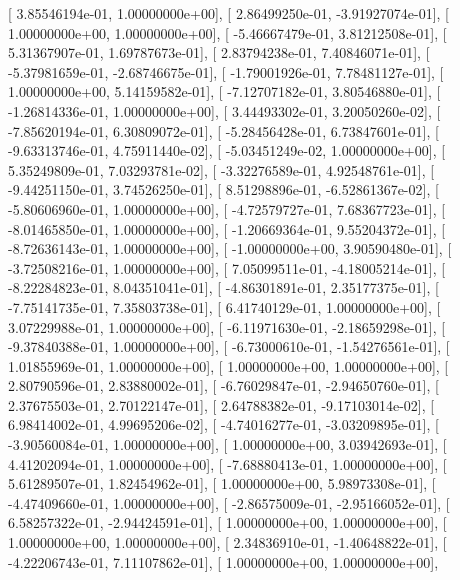 \documentclass{article}
\begin{document}
       [  3.85546194e-01,   1.00000000e+00],
       [  2.86499250e-01,  -3.91927074e-01],
       [  1.00000000e+00,   1.00000000e+00],
       [ -5.46667479e-01,   3.81212508e-01],
       [  5.31367907e-01,   1.69787673e-01],
       [  2.83794238e-01,   7.40846071e-01],
       [ -5.37981659e-01,  -2.68746675e-01],
       [ -1.79001926e-01,   7.78481127e-01],
       [  1.00000000e+00,   5.14159582e-01],
       [ -7.12707182e-01,   3.80546880e-01],
       [ -1.26814336e-01,   1.00000000e+00],
       [  3.44493302e-01,   3.20050260e-02],
       [ -7.85620194e-01,   6.30809072e-01],
       [ -5.28456428e-01,   6.73847601e-01],
       [ -9.63313746e-01,   4.75911440e-02],
       [ -5.03451249e-02,   1.00000000e+00],
       [  5.35249809e-01,   7.03293781e-02],
       [ -3.32276589e-01,   4.92548761e-01],
       [ -9.44251150e-01,   3.74526250e-01],
       [  8.51298896e-01,  -6.52861367e-02],
       [ -5.80606960e-01,   1.00000000e+00],
       [ -4.72579727e-01,   7.68367723e-01],
       [ -8.01465850e-01,   1.00000000e+00],
       [ -1.20669364e-01,   9.55204372e-01],
       [ -8.72636143e-01,   1.00000000e+00],
       [ -1.00000000e+00,   3.90590480e-01],
       [ -3.72508216e-01,   1.00000000e+00],
       [  7.05099511e-01,  -4.18005214e-01],
       [ -8.22284823e-01,   8.04351041e-01],
       [ -4.86301891e-01,   2.35177375e-01],
       [ -7.75141735e-01,   7.35803738e-01],
       [  6.41740129e-01,   1.00000000e+00],
       [  3.07229988e-01,   1.00000000e+00],
       [ -6.11971630e-01,  -2.18659298e-01],
       [ -9.37840388e-01,   1.00000000e+00],
       [ -6.73000610e-01,  -1.54276561e-01],
       [  1.01855969e-01,   1.00000000e+00],
       [  1.00000000e+00,   1.00000000e+00],
       [  2.80790596e-01,   2.83880002e-01],
       [ -6.76029847e-01,  -2.94650760e-01],
       [  2.37675503e-01,   2.70122147e-01],
       [  2.64788382e-01,  -9.17103014e-02],
       [  6.98414002e-01,   4.99695206e-02],
       [ -4.74016277e-01,  -3.03209895e-01],
       [ -3.90560084e-01,   1.00000000e+00],
       [  1.00000000e+00,   3.03942693e-01],
       [  4.41202094e-01,   1.00000000e+00],
       [ -7.68880413e-01,   1.00000000e+00],
       [  5.61289507e-01,   1.82454962e-01],
       [  1.00000000e+00,   5.98973308e-01],
       [ -4.47409660e-01,   1.00000000e+00],
       [ -2.86575009e-01,  -2.95166052e-01],
       [  6.58257322e-01,  -2.94424591e-01],
       [  1.00000000e+00,   1.00000000e+00],
       [  1.00000000e+00,   1.00000000e+00],
       [  2.34836910e-01,  -1.40648822e-01],
       [ -4.22206743e-01,   7.11107862e-01],
       [  1.00000000e+00,   1.00000000e+00],
\end{document}
